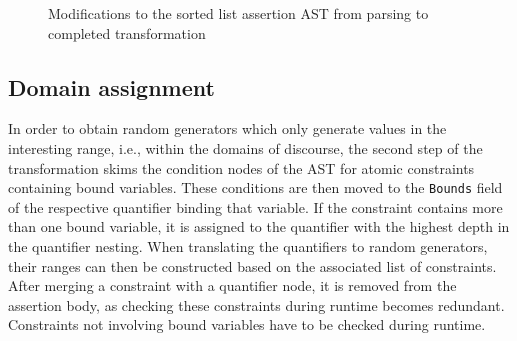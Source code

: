 \begin{figure}[t]
{}
\hfill
{}
\caption{Modifications to the sorted list assertion AST from parsing to completed transformation}
\end{figure}

\subsection{Domain assignment}
In order to obtain random generators which only generate values in the interesting range, i.e., within the domains of discourse, the second step of the transformation skims the condition nodes of the AST for atomic constraints containing bound variables. These conditions are then moved to the \texttt{Bounds} field of the respective quantifier binding that variable. If the constraint contains more than one bound variable, it is assigned to the quantifier with the highest depth in the quantifier nesting. When translating the quantifiers to random generators, their ranges can then be constructed based on the associated list of constraints. After merging a constraint with a quantifier node, it is removed from the assertion body, as checking these constraints during runtime becomes redundant. Constraints not involving bound variables have to be checked during runtime. 

